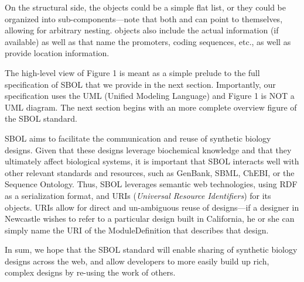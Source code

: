 On the structural side, the  objects could be a simple flat list, or they could be organized into sub-components---note that both  and  can point to themselves, allowing for arbitrary nesting.
 objects also include the actual  information (if available) as well as  that name the promoters, coding sequences, etc., as well as provide location information. 

The high-level view of Figure 1 is meant as a simple prelude to the full specification of SBOL that we provide in the next section. Importantly, our specification uses the UML (Unified Modeling Language) and Figure 1 is NOT a UML diagram. The next section begins with an more complete overview figure of the SBOL standard. 

SBOL aims to facilitate the communication and reuse of synthetic biology designs. Given that these designs leverage biochemical knowledge and that they ultimately affect biological systems, it is important that SBOL interacts well with other relevant standards and resources, such as GenBank, SBML, ChEBI, or the Sequence Ontology. Thus, SBOL leverages semantic web technologies, using RDF as a serialization format, and URIs (\emph{Universal Resource Identifiers}) for its objects. URIs allow for direct and un-ambiguous reuse of designs---if a designer in Newcastle wishes to refer to a particular design built in California, he or she can simply name the URI of the ModuleDefinition that describes that design. 

In sum, we hope that the SBOL standard will enable sharing of synthetic biology designs across the web, and allow developers to more easily build up rich, complex designs by re-using the work of others. 









